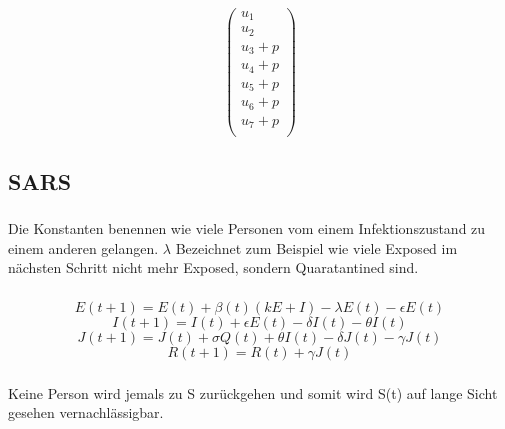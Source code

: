 \documentclass{article}
\begin{document}
\subsubsection{}

\subsubsection{}
\[
    \begin{pmatrix}
     u_1 \\
     u_2 \\
     u_3 + p  \\
     u_4 + p \\
     u_5 + p \\
     u_6 + p \\
     u_7 + p \\
    \end{pmatrix}
\]

\normalsize

\subsection{SARS}

\subsubsection{}
Die Konstanten benennen wie viele Personen vom einem Infektionszustand zu einem anderen gelangen.
$\lambda$ Bezeichnet zum Beispiel wie viele Exposed im nächsten Schritt nicht mehr Exposed, sondern Quaratantined sind.

\subsubsection{}
$$E(t+1) = E(t) + \beta(t)(kE+I) - \lambda E(t) - \epsilon E(t) $$
$$I(t+1) = I(t) + \epsilon E(t) - \delta I(t) - \theta I(t)$$
$$J(t+1) = J(t) + \sigma Q(t) + \theta I(t) - \delta J(t) - \gamma J(t)$$
$$R(t+1) = R(t) + \gamma J(t)$$

\subsubsection{}
Keine Person wird jemals zu S zurückgehen und somit wird S(t) auf lange Sicht gesehen vernachlässigbar.
\end{document}
